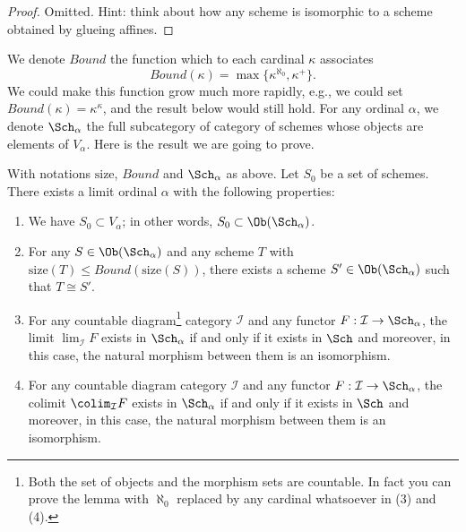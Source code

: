 \begin{proof}
Omitted. Hint: think about how any scheme is isomorphic to a scheme
obtained by glueing affines.
\end{proof}

\noindent
We denote $Bound$ the function which to each
cardinal $\kappa$ associates
\begin{equation}
\label{equation-bound}
Bound(\kappa) = \max\{\kappa^{\aleph_0}, \kappa^+\}.
\end{equation}
We could make this function grow much more rapidly, e.g., we could
set $Bound(\kappa) = \kappa^\kappa$, and the result below would still hold.
For any ordinal $\alpha$, we denote $\Sch_\alpha$ the full
subcategory of category of schemes whose objects are elements of
$V_\alpha$. Here is the result we are going to prove.

\begin{lemma}
\label{lemma-construct-category}
With notations $\text{size}$, $Bound$ and $\Sch_\alpha$ as above.
Let $S_0$ be a set of schemes. There exists a limit ordinal
$\alpha$ with the following properties:
\begin{enumerate}
\item
\label{item-inclusion}
We have $S_0 \subset V_\alpha$; in other words,
$S_0 \subset \Ob(\Sch_\alpha)$.
\item
\label{item-bounded}
For any $S \in \Ob(\Sch_\alpha)$ and any
scheme $T$ with $\text{size}(T) \leq Bound(\text{size}(S))$,
there exists a scheme $S' \in \Ob(\Sch_\alpha)$
such that $T \cong S'$.
\item
\label{item-limit}
For any countable diagram\footnote{Both the set of objects and
the morphism sets are countable. In fact you can prove the lemma with
$\aleph_0$ replaced by any cardinal whatsoever in (3) and (4).}
category $\mathcal{I}$ and
any functor $F : \mathcal{I} \to \Sch_\alpha$, the limit
$\lim_\mathcal{I} F$ exists in $\Sch_\alpha$ if and
only if it exists in $\Sch$ and moreover, in this case,
the natural morphism between them is an isomorphism.
\item
\label{item-colimit}
For any countable diagram category $\mathcal{I}$ and
any functor $F : \mathcal{I} \to \Sch_\alpha$, the colimit
$\colim_\mathcal{I} F$ exists in $\Sch_\alpha$ if and
only if it exists in $\Sch$ and moreover, in this case,
the natural morphism between them is an isomorphism.
\end{enumerate}
\end{lemma}

